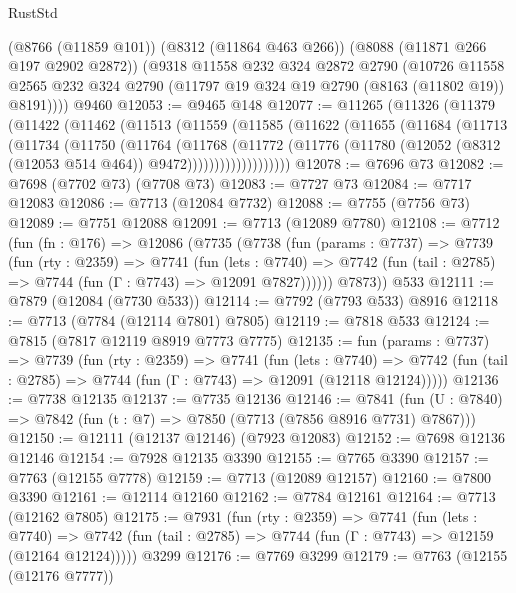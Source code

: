 \begin{lexlean}{RustStd}
\begin{coremodule}
      (@8766 (@11859 @101))
      (@8312 (@11864 @463 @266))
      (@8088 (@11871 @266 @197 @2902 @2872))
      (@9318
        @11558
        @232
        @324
        @2872
        @2790
        (@10726
          @11558
          @2565
          @232
          @324
          @2790
          (@11797 @19 @324 @19 @2790 (@8163 (@11802 @19)) @8191))))
    @9460
@12053 := @9465 @148
@12077 := @11265
    (@11326
      (@11379
        (@11422
          (@11462
            (@11513
              (@11559
                (@11585
                  (@11622
                    (@11655
                      (@11684
                        (@11713
                          (@11734
                            (@11750
                              (@11764
                                (@11768
                                  (@11772
                                    (@11776
                                      (@11780
                                        (@12052 (@8312 (@12053 @514 @464)) @9472)))))))))))))))))))
@12078 := @7696 @73
@12082 := @7698 (@7702 @73) (@7708 @73)
@12083 := @7727 @73
@12084 := @7717 @12083
@12086 := @7713 (@12084 @7732)
@12088 := @7755 (@7756 @73)
@12089 := @7751 @12088
@12091 := @7713 (@12089 @7780)
@12108 := @7712
    (fun (fn : @176) =>
    @12086
      (@7735
        (@7738
          (fun (params : @7737) =>
          @7739
            (fun (rty : @2359) =>
            @7741
              (fun (lets : @7740) =>
              @7742 (fun (tail : @2785) => @7744 (fun (Γ : @7743) => @12091 @7827))))))
        @7873))
    @533
@12111 := @7879 (@12084 (@7730 @533))
@12114 := @7792 (@7793 @533) @8916
@12118 := @7713 (@7784 (@12114 @7801) @7805)
@12119 := @7818 @533
@12124 := @7815 (@7817 @12119 @8919 @7773 @7775)
@12135 := fun (params : @7737) =>
  @7739
    (fun (rty : @2359) =>
    @7741
      (fun (lets : @7740) =>
      @7742 (fun (tail : @2785) => @7744 (fun (Γ : @7743) => @12091 (@12118 @12124)))))
@12136 := @7738 @12135
@12137 := @7735 @12136
@12146 := @7841 (fun (U : @7840) => @7842 (fun (t : @7) => @7850 (@7713 (@7856 @8916 @7731) @7867)))
@12150 := @12111 (@12137 @12146) (@7923 @12083)
@12152 := @7698 @12136 @12146
@12154 := @7928 @12135 @3390
@12155 := @7765 @3390
@12157 := @7763 (@12155 @7778)
@12159 := @7713 (@12089 @12157)
@12160 := @7800 @3390
@12161 := @12114 @12160
@12162 := @7784 @12161
@12164 := @7713 (@12162 @7805)
@12175 := @7931
    (fun (rty : @2359) =>
    @7741
      (fun (lets : @7740) =>
      @7742 (fun (tail : @2785) => @7744 (fun (Γ : @7743) => @12159 (@12164 @12124)))))
    @3299
@12176 := @7769 @3299
@12179 := @7763 (@12155 (@12176 @7777))

\end{coremodule}
\end{lexlean}
